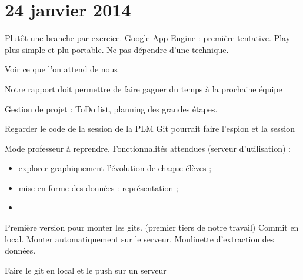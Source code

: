 \documentclass[12pt,a4paper]{article}
\begin{document}
\section{24 janvier 2014}

Plutôt une branche par exercice.
Google App Engine : première tentative.
Play plus simple et plu portable.
Ne pas dépendre d'une technique.
 
Voir ce que l'on attend de nous

Notre rapport doit permettre de faire gagner du temps à la prochaine équipe

Gestion de projet : ToDo list, planning des grandes étapes.

Regarder le code de la session de la PLM
Git pourrait faire l'espion et la session

Mode professeur à reprendre. Fonctionnalités attendues (serveur d'utilisation) :
\begin{itemize}
\item explorer graphiquement l'évolution de chaque élèves ;
\item mise en forme des données : représentation ;
\item 
\end{itemize}
Première version pour monter les gits. (premier tiers de notre travail)
Commit en local.
Monter automatiquement sur le serveur.
Moulinette d'extraction des données.
% 








Faire le git en local et le push sur un serveur
\end{document}
